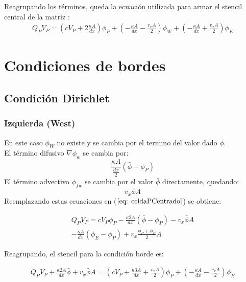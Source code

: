 \documentclass{article}
\begin{document}
        Reagrupando los términos, queda la ecuación utilizada para armar el stencil central de la matriz :
            \begin{multline}
    	    Q_P V_P = (c  V_P + 2 \frac{\kappa A}{dx} ) \phi_P + ( -\frac{\kappa A}{dx} - \frac{v_x A}{2}) \phi_W 
    	    + ( -\frac{\kappa A}{dx} + \frac{v_x A}{2}) \phi_E
            \label{eq: stencilCentral}
            \end{multline}
            
\section{Condiciones de bordes}
    \subsection{Condición Dirichlet} 
    \subsubsection{Izquierda (West)}
        En este caso $\phi_W$ no existe y se cambia por el termino del valor dado $\bar{\phi}$. \\
        El término difusivo $\nabla \phi_w$ se cambia por:
        \begin{equation*}
        \frac{\kappa A}{\frac{dx}{2}} \left( \bar{\phi} - \phi_P \right)
        \end{equation*}{}
        El término advectivo $\phi_{fw}$ se cambia por el valor $\bar{\phi}$ directamente, quedando:
        \begin{equation*}
            v_x \bar{\phi} A
        \end{equation*}
        Reemplazando estas ecuaciones en ($\ref{eq: celdaPCentrado}$) se obtiene:
        
        \begin{multline*}
    	    Q_P V_P = c  V_P \phi_P - \frac{\kappa 2 A}{dx} \left( \bar{\phi} - \phi_P \right) - v_x \bar{\phi} A \\ 
    	        - \frac{\kappa A}{dx} \left( \phi_E - \phi_P \right) + v_x \frac{\phi_P +  \phi_E}{2} A
        \end{multline*}
        
        Reagrupando, el stencil para la condición borde es:
        
        \begin{multline}
    	    Q_P V_P + \frac{\kappa 2 A}{dx} \bar{\phi} + v_x \bar{\phi} A = (c  V_P  + \frac{\kappa 3 A}{dx} + \frac{v_x A}{2}) \phi_P 
    	    + ( -\frac{\kappa A}{dx} - \frac{v_x A}{2}) \phi_E
    	    \label{eq:stencilDirW}
        \end{multline}
\end{document}
